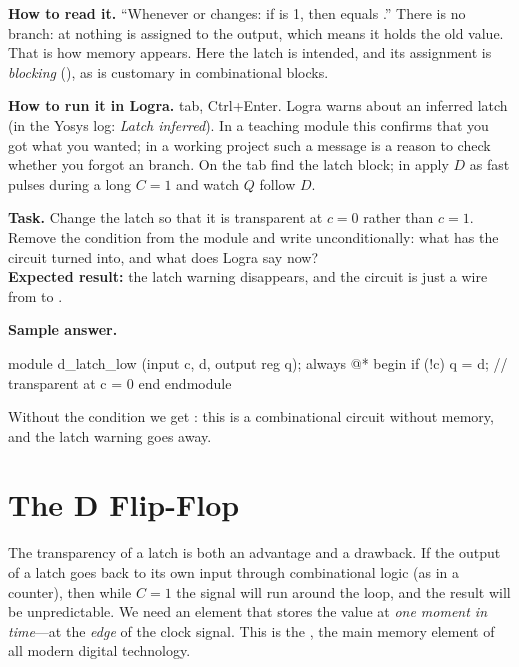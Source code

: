 \textbf{How to read it.} ``Whenever  or  changes: if  is
1, then  equals .'' There is no  branch: at
 nothing is assigned to the output, which means it holds the old
value. That is how memory appears. Here the latch is intended, and its
assignment is \emph{blocking} (\code{=}), as is customary in combinational
blocks.

\textbf{How to run it in Logra.}  tab, Ctrl+Enter. Logra warns about
an inferred latch (in the Yosys log: \emph{Latch inferred}). In a teaching
module this confirms that you got what you wanted; in a working project such a
message is a reason to check whether you forgot an  branch. On the
 tab find the latch block; in  apply $D$ as fast
pulses during a long $C=1$ and watch $Q$ follow $D$.

\begin{diybox}
\textbf{Task.}  Change the latch so that it is transparent at $c=0$
rather than $c=1$.  Remove the condition from the module and write
 unconditionally: what has the circuit turned into, and what does
Logra say now?\\
\textbf{Expected result:} the latch warning disappears, and the circuit is just a
wire from  to .
\end{diybox}

\textbf{Sample answer.}
\begin{vcode}
module d_latch_low (input c, d, output reg q);
    always @* begin
        if (!c) q = d;       // transparent at c = 0
    end
endmodule
\end{vcode}
Without the condition we get : this is a combinational
circuit without memory, and the latch warning goes away.

\section{The D Flip-Flop}

The transparency of a latch is both an advantage and a drawback. If the output
of a latch goes back to its own input through combinational logic (as in a
counter), then while $C=1$ the signal will run around the loop, and the result
will be unpredictable. We need an element that stores the value at \emph{one
moment in time}---at the \emph{edge} of the clock signal. This is the
, the main memory element of all modern digital
technology.

